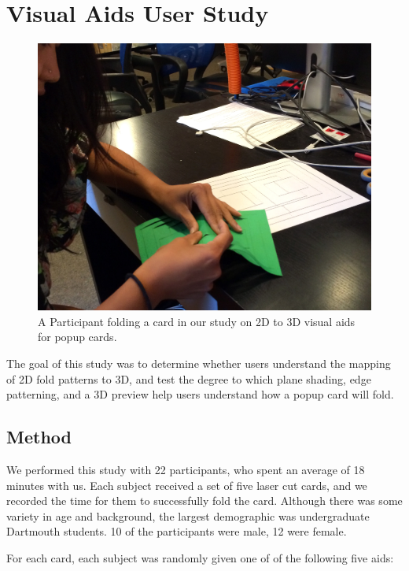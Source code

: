 \section{Visual Aids User Study}\label{visual-aids-user-study}

\begin{figure}[htbp]
\centering
\includegraphics{figures/51_User_Study_Visual_Aids/kikofoldling.jpg}
\caption{A Participant folding a card in our study on 2D to 3D visual
aids for popup cards.}
\end{figure}

The goal of this study was to determine whether users understand the
mapping of 2D fold patterns to 3D, and test the degree to which plane
shading, edge patterning, and a 3D preview help users understand how a
popup card will fold.

\subsection{Method}\label{method}

We performed this study with 22 participants, who spent an average of 18
minutes with us. Each subject received a set of five laser cut cards,
and we recorded the time for them to successfully fold the card.
Although there was some variety in age and background, the largest
demographic was undergraduate Dartmouth students. 10 of the participants
were male, 12 were female.

For each card, each subject was randomly given one of of the following
five aids:

